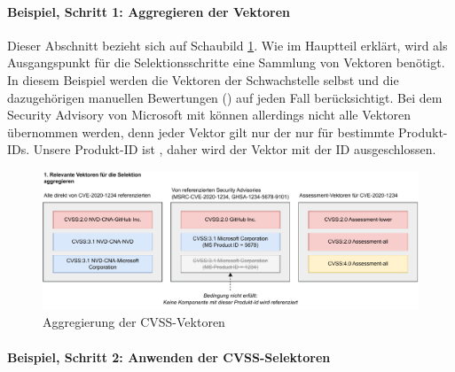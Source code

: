 \newpage
\paragraph{Beispiel, Schritt 1: Aggregieren der Vektoren} \label{par:projektbericht-loesungsweg-cvss-selection-example-step-1}

Dieser Abschnitt bezieht sich auf Schaubild \ref{fig:cvss-selection-process-selection-1}.
Wie im Hauptteil erklärt, wird als Ausgangspunkt für die Selektionsschritte eine Sammlung von Vektoren benötigt.
In diesem Beispiel werden die Vektoren der Schwachstelle  selbst und die dazugehörigen manuellen Bewertungen () auf jeden Fall berücksichtigt.
Bei dem Security Advisory von Microsoft mit  können allerdings nicht alle Vektoren übernommen werden, denn jeder Vektor gilt nur der nur für bestimmte Produkt-IDs.
Unsere Produkt-ID ist , daher wird der Vektor mit der ID  ausgeschlossen.

\begin{figure}[htbp] %
    \centering
    \includegraphics[width=1\textwidth, keepaspectratio]{res/grafiken/cvss-selection-process-selection-1}
    \caption{Aggregierung der CVSS-Vektoren}
    \label{fig:cvss-selection-process-selection-1}
\end{figure}

\paragraph{Beispiel, Schritt 2: Anwenden der CVSS-Selektoren} \label{par:projektbericht-loesungsweg-cvss-selection-example-step-2}


